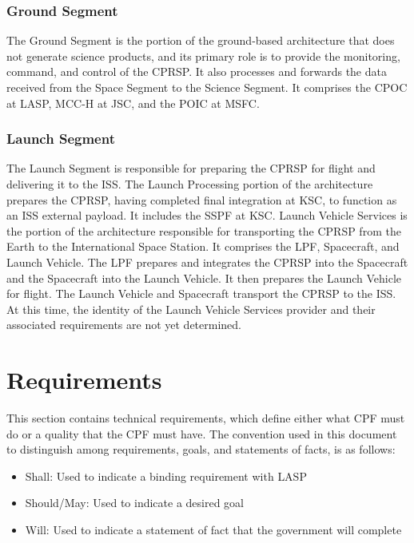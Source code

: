 \subsection{Ground Segment }
\label{groundsegment}

The Ground Segment is the portion of the ground-based architecture that does not generate science products, and its primary role is to provide the monitoring, command, and control of the \gls{CPRSP}. It also processes and forwards the data received from the Space Segment to the Science Segment. It comprises the \gls{CPOC} at \gls{LASP}, \gls{MCC-H} at \gls{JSC}, and the \gls{POIC} at \gls{MSFC}.

\subsection{Launch Segment }
\label{launchsegment}

The Launch Segment is responsible for preparing the \gls{CPRSP} for flight and delivering it to the \gls{ISS}. The Launch Processing portion of the architecture prepares the \gls{CPRSP}, having completed final integration at \gls{KSC}, to function as an \gls{ISS} external payload. It includes the \gls{SSPF} at \gls{KSC}. Launch Vehicle Services is the portion of the architecture responsible for transporting the \gls{CPRSP} from the Earth to the International Space Station. It comprises the \gls{LPF}, Spacecraft, and Launch Vehicle. The \gls{LPF} prepares and integrates the \gls{CPRSP} into the Spacecraft and the Spacecraft into the Launch Vehicle. It then prepares the Launch Vehicle for flight. The Launch Vehicle and Spacecraft transport the \gls{CPRSP} to the \gls{ISS}. At this time, the identity of the Launch Vehicle Services provider and their associated requirements are not yet determined.

\chapter{Requirements  }
\label{sec_req}

\renewcommand\labelitemi{}

This section contains technical requirements, which define either what \gls{CPF} must do or a quality that the \gls{CPF} must have.
The convention used in this document to distinguish among requirements, goals, and statements of facts, is as follows:

\begin{itemize}
\item{} Shall: Used to indicate a binding requirement with \gls{LASP}

\item{} Should\slash May: Used to indicate a desired goal

\item{} Will: Used to indicate a statement of fact that the government will complete

\end{itemize}

